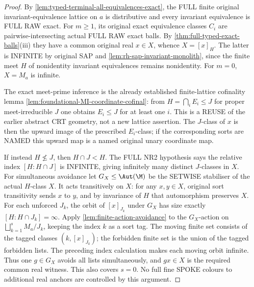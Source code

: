 \begin{proof}
By \cref{lem:typed-terminal-all-equivalences-exact},
the FULL finite original invariant-equivalence
lattice on $a$ is distributive and every
invariant equivalence is FULL RAW exact.
For $m\ge1$, its original exact
equivalence classes $C_i$ are
pairwise-intersecting actual FULL RAW
exact balls. By
\cref{thm:full-typed-exact-balls}(iii)
they have a common original real
$x\in X$, whence
$X=[x]_H$. The latter is INFINITE
by original SAP and
\cref{lem:rh-sap-invariant-monolith},
since the finite meet $H$ of
nonidentity invariant equivalences
remains nonidentity. For $m=0$,
$X=M_a$ is infinite.

The exact meet-prime inference is
the already established finite-lattice
cofinality lemma
\cref{lem:foundational-MI-coordinate-cofinal}:
from $H=\bigcap_iE_i\le J$
for proper meet-irreducible $J$
one obtains $E_i\le J$ for
at least one $i$.
This is a REUSE of the earlier
abstract CRT geometry, not
a new lattice assertion.
The $J$-class of $x$ is then
the upward image of the
prescribed $E_i$-class; if the
corresponding sorts are NAMED
this upward map is a named
original unary coordinate map.

If instead $H\nleq J$,
then $H\cap J<H$.
The FULL NR2 hypothesis says the
relative index $[H:H\cap J]$
is INFINITE, giving infinitely
many distinct $J$-classes in $X$.
For simultaneous avoidance let
$G_X\le\Aut(\M)$ be the SETWISE
stabiliser of the actual $H$-class $X$.
It acts transitively on $X$:
for any $x,y\in X$, original
sort transitivity sends $x$ to
$y$, and by invariance of $H$
that automorphism preserves $X$.
For each unforced $J_k$, the
orbit of $[x]_{J_k}$ under $G_X$
has size exactly
$[H:H\cap J_k]=\infty$.
Apply \cref{lem:finite-action-avoidance} to the $G_X$-action on
$\bigsqcup_{k=1}^s M_a/J_k$, keeping the index $k$ as a sort tag.
The moving finite set consists of the tagged classes $(k,[x]_{J_k})$;
the forbidden finite set is the union of the tagged forbidden lists.
The preceding index calculation makes each moving orbit infinite.
Thus one $g\in G_X$ avoids all lists simultaneously, and $gx\in X$
is the required common real witness. This also covers $s=0$.
No full fine SPOKE colours to
additional real anchors are
controlled by this argument.
\end{proof}

